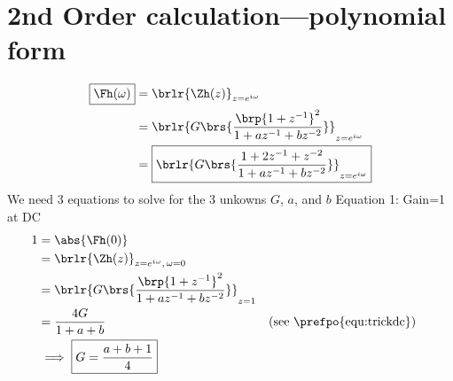 \section{2nd Order  calculation---polynomial form}
 \vfill
\begin{align*}
  \boxed{\Fh(\omega)}
    &= \brlr{\Zh(z)}_{z=e^{i\omega}}
  \\&= \brlr{G\brs{\frac{\brp{1+z^{-1}}^2}
                        {1 + az^{-1} + bz^{-2}}}}_{z=e^{i\omega}}
  \\&= \boxed{\brlr{
         G\brs{\frac{1 + 2z^{-1} +  z^{-2}}
                    {1 + az^{-1} + bz^{-2}}
              }
                   }_{z=e^{i\omega}}
             }
\end{align*}
\vfill
We need 3 equations to solve for the 3 unkowns $G$, $a$, and $b$
\vfill 
Equation 1: Gain=1 at DC
\vfill
\begin{align*}
  1 &= \abs{\Fh(0)}
  \\&= \brlr{\Zh(z)}_{z=e^{i\omega},\,\omega=0}
  \\&= \brlr{G\brs{\frac{\brp{1+z^{-1}}^2}
                      {1 + az^{-1} + bz^{-2}}}}_{z=1}
  \\&= \frac{4G}{1 + a + b}
    && \text{(see \prefpo{equ:trickdc})}
  \\&\implies \boxed{G = \frac{a + b + 1}{4}}
\end{align*}
\vfill 

